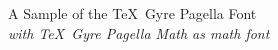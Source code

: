 \documentclass[11pt]{article}
\begin{document}
{\LARGE \noindent A Sample of the \TeX\ Gyre Pagella Font}\\

{\large \noindent \textit{with \TeX\ Gyre Pagella Math as math font}}\\[5pt]


\end{document}
